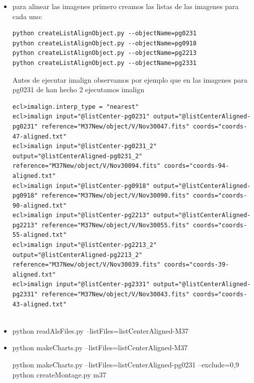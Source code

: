 \documentclass{article}
\begin{document}
\begin{itemize}
{\begin{verbatim}
\end{verbatim}
}

\item 

para alinear las imagenes primero creamos las listas de las imagenes para cada uno:

\begin{verbatim}
python createListAlignObject.py --objectName=pg0231
python createListAlignObject.py --objectName=pg0918
python createListAlignObject.py --objectName=pg2213
python createListAlignObject.py --objectName=pg2331

\end{verbatim}
Antes de ejecutar imalign observamos por ejemplo que en las imagenes para pg0231 de han hecho 2
ejecutamos imalign


{\tiny 
\begin{verbatim}
ecl>imalign.interp_type = "nearest" 
ecl>imalign input="@listCenter-pg0231" output="@listCenterAligned-pg0231" reference="M37New/object/V/Nov30047.fits" coords="coords-47-aligned.txt"
ecl>imalign input="@listCenter-pg0231_2" output="@listCenterAligned-pg0231_2" reference="M37New/object/V/Nov30094.fits" coords="coords-94-aligned.txt"
ecl>imalign input="@listCenter-pg0918" output="@listCenterAligned-pg0918" reference="M37New/object/V/Nov30090.fits" coords="coords-90-aligned.txt"
ecl>imalign input="@listCenter-pg2213" output="@listCenterAligned-pg2213" reference="M37New/object/V/Nov30055.fits" coords="coords-55-aligned.txt"
ecl>imalign input="@listCenter-pg2213_2" output="@listCenterAligned-pg2213_2" reference="M37New/object/V/Nov30039.fits" coords="coords-39-aligned.txt"
ecl>imalign input="@listCenter-pg2331" output="@listCenterAligned-pg2331" reference="M37New/object/V/Nov30043.fits" coords="coords-43-aligned.txt"


\end{verbatim}
}

\item python readAlsFiles.py --listFiles=listCenterAligned-M37
\item python makeCharts.py --listFiles=listCenterAligned-M37

 python makeCharts.py --listFiles=listCenterAligned-pg0231 --exclude=0,9
python createMontage.py m37
\end{itemize}
\end{document}
